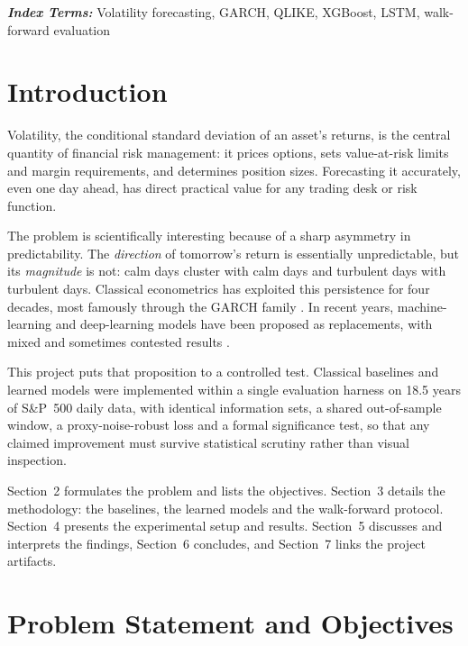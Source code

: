 \documentclass[a4paper,twocolumn,10pt]{article}
\begin{document}
\vspace{2mm}
\noindent\textbf{\textit{Index Terms:}} Volatility forecasting, GARCH, QLIKE, XGBoost, LSTM, walk-forward evaluation

\section{Introduction}

Volatility, the conditional standard deviation of an asset's returns, is the central quantity of financial risk management: it prices options, sets value-at-risk limits and margin requirements, and determines position sizes. Forecasting it accurately, even one day ahead, has direct practical value for any trading desk or risk function.

The problem is scientifically interesting because of a sharp asymmetry in predictability. The \emph{direction} of tomorrow's return is essentially unpredictable, but its \emph{magnitude} is not: calm days cluster with calm days and turbulent days with turbulent days. Classical econometrics has exploited this persistence for four decades, most famously through the GARCH family \cite{bollerslev1986}. In recent years, machine-learning and deep-learning models have been proposed as replacements, with mixed and sometimes contested results \cite{hansen2005}.

This project puts that proposition to a controlled test. Classical baselines and learned models were implemented within a single evaluation harness on 18.5 years of S\&P~500 daily data, with identical information sets, a shared out-of-sample window, a proxy-noise-robust loss and a formal significance test, so that any claimed improvement must survive statistical scrutiny rather than visual inspection.

Section~2 formulates the problem and lists the objectives. Section~3 details the methodology: the baselines, the learned models and the walk-forward protocol. Section~4 presents the experimental setup and results. Section~5 discusses and interprets the findings, Section~6 concludes, and Section~7 links the project artifacts.

\section{Problem Statement and Objectives}
\end{document}
